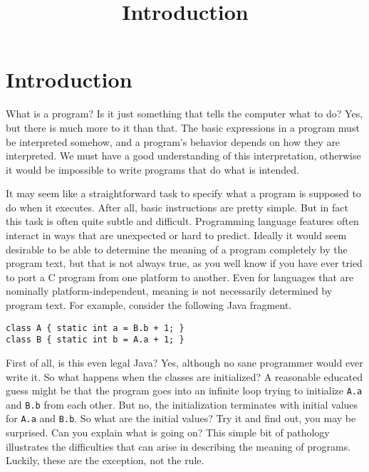 \title{Introduction}
\maketitle

\section{Introduction}

What is a program? Is it just something that tells the
computer what to do? Yes, but there is much more to it than that.
The basic expressions in a program must be interpreted somehow,
and a program's behavior depends on how they are interpreted. We must have
a good understanding of this interpretation, otherwise it would be
impossible to write programs that do what is intended.

It may seem like a straightforward task to specify what a program is supposed
to do when it executes. After all, basic instructions are pretty simple.
But in fact this task is often quite subtle and difficult. Programming
language features often interact in ways that are unexpected or hard to predict.
Ideally it would seem desirable to be able to determine the meaning of a program
completely by the program text, but that is not always true, as you well
know if you have ever tried to port a C program from one platform to another.
Even for languages that are nominally platform-independent, meaning is not
necessarily determined by program text. For example, consider the following Java fragment.

\begin{flushleft}
\texttt{\phantom{dddd}class A \{ static int a = B.b + 1; \}}\\
\texttt{\phantom{dddd}class B \{ static int b = A.a + 1; \}}
\end{flushleft}

First of all, is this even legal Java? Yes, although no sane programmer
would ever write it. So what happens when the classes are initialized?
A reasonable educated guess might be that the program goes into an
infinite loop trying to initialize \texttt{A.a} and \texttt{B.b} from each other. But no,
the initialization terminates with initial values for \texttt{A.a} and \texttt{B.b}.
So what are the initial values? Try it and find out,
you may be surprised. Can you explain what is going on?
This simple bit of pathology illustrates the difficulties that can arise
in describing the meaning of programs. Luckily, these are the exception, not the rule.


